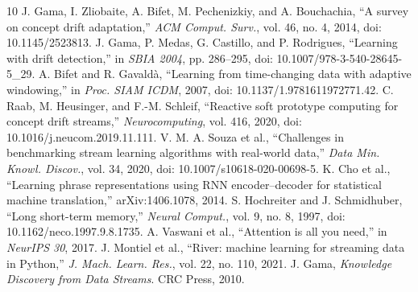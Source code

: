 \documentclass[10pt,twocolumn]{article}
\begin{document}
\begin{thebibliography}{10}
 J. Gama, I. Zliobaite, A. Bifet, M. Pechenizkiy, and A. Bouchachia, ``A survey on concept drift adaptation,'' \emph{ACM Comput. Surv.}, vol. 46, no. 4, 2014, doi: 10.1145/2523813.
 J. Gama, P. Medas, G. Castillo, and P. Rodrigues, ``Learning with drift detection,'' in \emph{SBIA 2004}, pp. 286--295, doi: 10.1007/978-3-540-28645-5\_29.
 A. Bifet and R. Gavaldà, ``Learning from time-changing data with adaptive windowing,'' in \emph{Proc. SIAM ICDM}, 2007, doi: 10.1137/1.9781611972771.42.
 C. Raab, M. Heusinger, and F.-M. Schleif, ``Reactive soft prototype computing for concept drift streams,'' \emph{Neurocomputing}, vol. 416, 2020, doi: 10.1016/j.neucom.2019.11.111.
 V. M. A. Souza et al., ``Challenges in benchmarking stream learning algorithms with real-world data,'' \emph{Data Min. Knowl. Discov.}, vol. 34, 2020, doi: 10.1007/s10618-020-00698-5.
 K. Cho et al., ``Learning phrase representations using RNN encoder--decoder for statistical machine translation,'' arXiv:1406.1078, 2014.
 S. Hochreiter and J. Schmidhuber, ``Long short-term memory,'' \emph{Neural Comput.}, vol. 9, no. 8, 1997, doi: 10.1162/neco.1997.9.8.1735.
 A. Vaswani et al., ``Attention is all you need,'' in \emph{NeurIPS 30}, 2017.
 J. Montiel et al., ``River: machine learning for streaming data in Python,'' \emph{J. Mach. Learn. Res.}, vol. 22, no. 110, 2021.
 J. Gama, \emph{Knowledge Discovery from Data Streams}. CRC Press, 2010.
\end{thebibliography}
\end{document}
